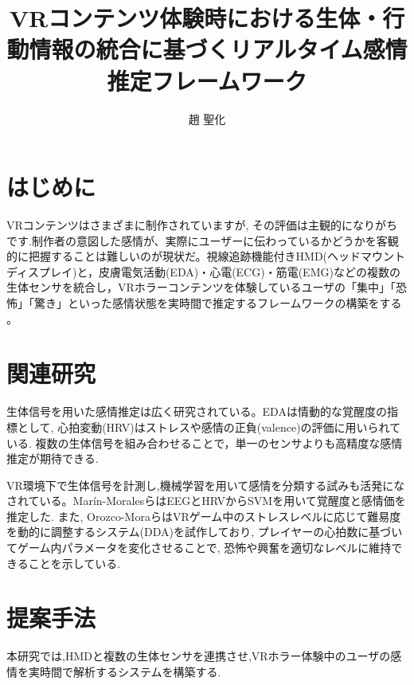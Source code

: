 \documentclass[paper=a4paper,fontsize=10pt,jafontscale=0.925,twocolumn]{jlreq}
\title{VRコンテンツ体験時における生体・行動情報の統合に基づくリアルタイム感情推定フレームワーク} %
\affiliation{人間システム工学科 井村研究室} %
\author{趙 聖化} %
\begin{document}
\maketitle


\section{はじめに}

VRコンテンツはさまざまに制作されていますが, その評価は主観的になりがちです.制作者の意図した感情が、実際にユーザーに伝わっているかどうかを客観的に把握することは難しいのが現状だ。視線追跡機能付きHMD(ヘッドマウントディスプレイ)と，皮膚電気活動(EDA)・心電(ECG)・筋電(EMG)などの複数の生体センサを統合し，VRホラーコンテンツを体験しているユーザの「集中」「恐怖」「驚き」といった感情状態を実時間で推定するフレームワークの構築をする 。

\section{関連研究}

生体信号を用いた感情推定は広く研究されている。EDAは情動的な覚醒度の指標として, 心拍変動(HRV)はストレスや感情の正負(valence)の評価に用いられている. 複数の生体信号を組み合わせることで，単一のセンサよりも高精度な感情推定が期待できる\cite{Guixeres2020, Glancy2021}.

VR環境下で生体信号を計測し,機械学習を用いて感情を分類する試みも活発になされている。Marín-Moralesら\cite{Marin-Morales2018}はEEGとHRVからSVMを用いて覚醒度と感情価を推定した. また, Orozco-Moraら\cite{Orozco-Mora2024}はVRゲーム中のストレスレベルに応じて難易度を動的に調整するシステム(DDA)を試作しており, プレイヤーの心拍数に基づいてゲーム内パラメータを変化させることで, 恐怖や興奮を適切なレベルに維持できることを示している.

\section{提案手法}

本研究では,HMDと複数の生体センサを連携させ,VRホラー体験中のユーザの感情を実時間で解析するシステムを構築する.
\end{document}
